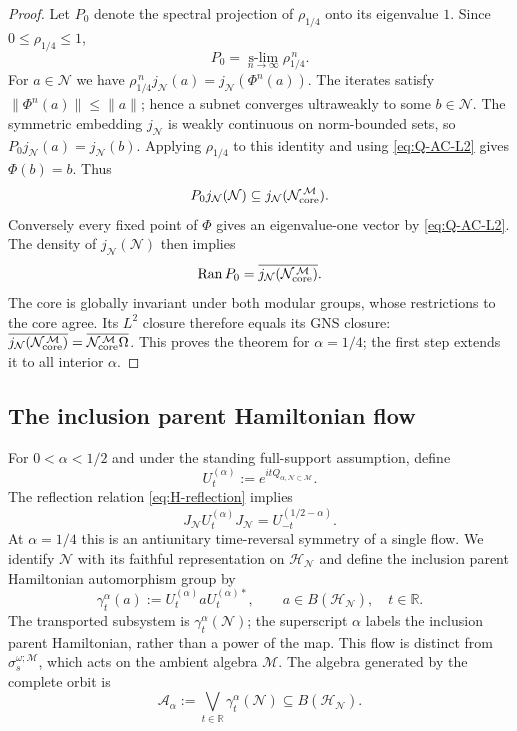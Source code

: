 \documentclass[a4paper,11pt]{article}
\theoremstyle{definition}
\newcommand{\mN}{\mathcal{N}}
\newcommand{\mH}{\mathcal{H}}
\newcommand{\mM}{\mathcal{M}}
\begin{document}
\begin{proof}
Let $P_0$ denote the spectral projection of $\rho_{1/4}$
onto its eigenvalue $1$. Since $0\leq\rho_{1/4}\leq1$,
\begin{equation}
 P_0=\operatorname*{s-lim}_{n\to\infty}\rho_{1/4}^{\,n}.
\end{equation}
For $a\in\mN$ we have
$\rho_{1/4}^{\,n}j_\mN(a)=j_\mN(\Phi^n(a))$.
The iterates satisfy $\|\Phi^n(a)\|\leq\|a\|$; hence a subnet
converges ultraweakly to some $b\in\mN$. The symmetric embedding
$j_\mN$ is weakly continuous on norm-bounded sets, so
$P_0j_\mN(a)=j_\mN(b)$. Applying $\rho_{1/4}$ to this identity
and using \eqref{eq:Q-AC-L2} gives $\Phi(b)=b$. Thus
\begin{equation}
 P_0j_\mN(\mN)\subseteq
 j_\mN(\mN_{\rm core}^{\,\mM}).
\end{equation}
Conversely every fixed point of $\Phi$ gives an eigenvalue-one
vector by \eqref{eq:Q-AC-L2}. The density of $j_\mN(\mN)$
then implies
\begin{equation}
 \operatorname{Ran}P_0
 =\overline{j_\mN(\mN_{\rm core}^{\,\mM})}.
\end{equation}
The core is globally invariant under both modular groups, whose
restrictions to the core agree. Its $L^2$ closure therefore equals
its GNS closure:
$\overline{j_\mN(\mN_{\rm core}^{\,\mM})}
 =\overline{\mN_{\rm core}^{\,\mM}\Omega}$.
This proves the theorem for $\alpha=1/4$; the first step
extends it to all interior $\alpha$.
\end{proof}

\subsection{The inclusion parent Hamiltonian flow}

For $0<\alpha<1/2$ and under the standing full-support assumption, define
\begin{equation}
    U_t^{(\alpha)}:=e^{itQ_{\alpha,\mN\subset\mM}}.
\end{equation}
The reflection relation \eqref{eq:H-reflection} implies
\begin{equation}
    J_{\mN}U_t^{(\alpha)}J_{\mN}=U_{-t}^{(1/2-\alpha)}.
    \label{eq:H-quarter-time-reversal}
\end{equation}
At $\alpha=1/4$ this is an antiunitary time-reversal symmetry of a single flow. We identify $\mN$ with its faithful representation on
$\mH_{\mN}$ and define the inclusion parent Hamiltonian automorphism group by
\begin{equation}
    \gamma_t^\alpha(a)
    :=U_t^{(\alpha)}aU_t^{(\alpha)*},
    \qquad a\in B(\mH_{\mN}),\quad t\in\mathbb R.
    \label{eq:N-alpha-t-general}
\end{equation}
The transported subsystem is $\gamma_t^\alpha(\mN)$; the superscript
$\alpha$ labels the inclusion parent Hamiltonian, rather than a power of the map.
This flow is distinct from $\sigma_s^{\omega;\mM}$, which acts on the
ambient algebra $\mM$.
The algebra generated by the complete orbit is
\begin{equation}
    \mathcal A_\alpha
    :=
    \bigvee_{t\in\mathbb R}
    \gamma_t^\alpha(\mN)
    \subseteq B(\mH_{\mN}).
    \label{eq:A-alpha-general}
\end{equation}
\end{document}

